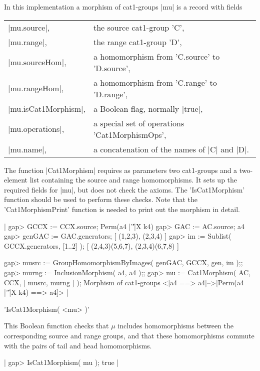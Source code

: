 In this implementation a morphism of cat1-groups  |mu|
is a record with fields\:

\begin{tabular}{ll}
|mu.source|,         & the source cat1-group 'C',              \\
|mu.range|,          & the range cat1-group  'D',               \\
|mu.sourceHom|,      & a homomorphism from 'C.source' to 'D.source',\\
|mu.rangeHom|,       & a homomorphism from 'C.range' to 'D.range',  \\
|mu.isCat1Morphism|, & a Boolean flag, normally |true|,             \\
|mu.operations|,     & a special set of operations 'Cat1MorphismOps', \\
|mu.name|,           & a concatenation of the names of |C| and |D|.
\end{tabular}

The function |Cat1Morphism| requires as parameters two cat1-groups
and a two-element list containing the source and range homomorphisms.
It sets up the required fields for |mu|, but does not check the axioms.
The  'IsCat1Morphism'  function should be used to perform these checks.
Note that the  'Cat1MorphismPrint'  function is needed to print out the
morphism in detail.

|    gap> GCCX := CCX.source;
    Perm(a4 |'\|'|X k4)
    gap> GAC := AC.source;
    a4
    gap> genGAC := GAC.generators;
    [ (1,2,3), (2,3,4) ]
    gap> im := Sublist( GCCX.generators, [1..2] );
    [ (2,4,3)(5,6,7), (2,3,4)(6,7,8) ]

    gap> musrc := GroupHomomorphismByImages( genGAC, GCCX, gen, im );;
    gap> murng := InclusionMorphism( a4, a4 );;
    gap> mu := Cat1Morphism( AC, CCX, [ musrc, murng ] );
    Morphism of cat1-groups <[a4 ==> a4]-->[Perm(a4 |'\|'|X k4) ==> a4]>   |

%

'IsCat1Morphism( <mu> )'

This Boolean function checks that $\mu$ includes homomorphisms between the
corresponding source and range groups, and that these homomorphisms commute
with the pairs of tail and head homomorphisms.

|    gap> IsCat1Morphism( mu );
    true |
    
%

